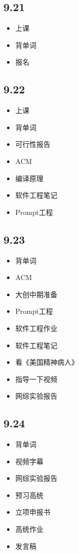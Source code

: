 \documentclass[UTF8]{ctexart}
\begin{document}
\subsection*{9.21}
\begin{itemize}
    \item 上课
    \item 背单词
    \item 报名
\end{itemize}
\subsection*{9.22}
\begin{itemize}
    \item 上课
    \item 背单词
    \item 可行性报告
    \item ACM
    \item 编译原理
    \item 软件工程笔记
    \item Prompt工程
\end{itemize}
\subsection*{9.23}
\begin{itemize}
    \item 背单词
    \item ACM
    \item 大创中期准备
    \item Prompt工程
    \item 软件工程作业
    \item 软件工程笔记
    \item 看《美国精神病人》
    \item 指导一下视频
    \item 网综实验报告
\end{itemize}
\subsection*{9.24}
\begin{itemize}
    \item 背单词
    \item 视频字幕
    \item 网综实验报告
    \item 预习高统
    \item 立项申报书
    \item 高统作业
    \item 发言稿
\end{itemize}
\end{document}
